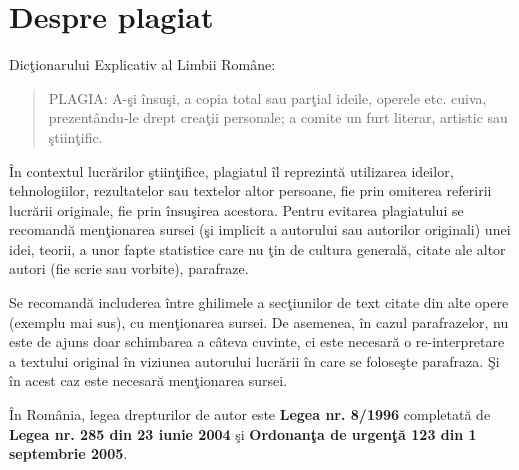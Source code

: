\chapter{Despre plagiat}
\label{chap:div}


 Dicţionarului Explicativ al Limbii Române:

\blockquote{PLAGIA: A-şi însuşi, a copia total sau parţial ideile, operele etc. cuiva, prezentându-le drept creaţii personale; a comite un furt literar, artistic sau ştiinţific.}

	În contextul lucrărilor ştiinţifice, plagiatul îl reprezintă utilizarea ideilor, tehnologiilor, rezultatelor sau textelor altor persoane, fie prin omiterea referirii lucrării originale, fie prin însuşirea acestora. Pentru evitarea plagiatului se recomandă menţionarea sursei (şi implicit a autorului sau autorilor originali) unei idei, teorii, a unor fapte statistice care nu ţin de cultura generală, citate ale altor autori (fie scrie sau vorbite), parafraze.

	Se recomandă includerea între ghilimele a secţiunilor de text citate din alte opere (exemplu mai sus), cu menţionarea sursei. De asemenea, în cazul parafrazelor, nu este de ajuns doar schimbarea a câteva cuvinte, ci este necesară o re-interpretare a textului original în viziunea autorului lucrării în care se foloseşte parafraza. Şi în acest caz este necesară menţionarea sursei.

	În România, legea drepturilor de autor este \textbf{Legea nr. 8/1996} completată de \textbf{Legea nr. 285 din 23 iunie 2004} şi \textbf{Ordonanţa de urgenţă 123 din 1 septembrie 2005}.

